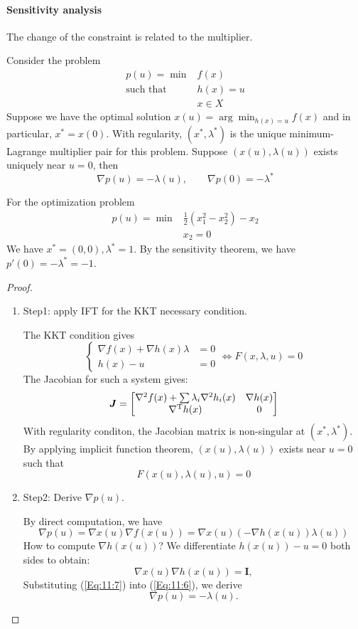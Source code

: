 \paragraph{Sensitivity analysis}
The change of the constraint is related to the multiplier. 
\begin{theorem}
Consider the problem
\[
\begin{array}{ll}
p(u)=\min&f(x)\\
\mbox{such that}&h(x)=u\\
&x\in X
\end{array}
\]
Suppose we have the optimal solution $x(u)=\arg\min_{h(x)=u}f(x)$ and in particular, $x^*=x(0)$. With regularity, $(x^*,\lambda^*)$ is the unique minimum-Lagrange multiplier pair for this problem. Suppose $(x(u),\lambda(u))$ exists uniquely near $u=0$, then
\[
\nabla p(u) = -\lambda(u),\qquad
\nabla p(0) = -\lambda^*
\]
\end{theorem}

\begin{example}
For the optimization problem
\[
\begin{array}{ll}
p(u)=\min&\frac{1}{2}(x_1^2-x_2^2) - x_2\\
&x_2=0
\end{array}
\]
We have $x^*=(0,0),\lambda^*=1$. By the sensitivity theorem, we have $p'(0)=-\lambda^*=-1$.
\end{example}
\begin{proof}
\begin{enumerate}
\item
Step1: apply IFT for the KKT necessary condition.

The KKT condition gives
\[
\left\{
\begin{aligned}
\nabla f(x) + \nabla h(x)\lambda&=0\\
h(x)- u&=0
\end{aligned}
\right.\Longleftrightarrow
F(x,\lambda,u)=0
\]
The Jacobian for such a system gives:
\[
\bm J=\begin{bmatrix}
\nabla^2f(x)+\sum\lambda_i\nabla^2h_i(x)&\nabla h(x)\\
\nabla^{\mathrm T} h(x)&0
\end{bmatrix}
\]
With regularity conditon, the Jacobian matrix is non-singular at $(x^*,\lambda^*)$. By applying implicit function theorem, $(x(u),\lambda(u))$ exists near $u=0$ such that
\[
F(x(u),\lambda(u),u)=0
\]
\item
Step2: Derive $\nabla p(u)$.

By direct computation, we have
\begin{equation}\label{Eq:11:6}
\nabla p(u)=\nabla x(u)\nabla f(x(u)) = \nabla x(u)\left(
-\nabla h(x(u))\lambda(u)
\right)
\end{equation}
How to compute $\nabla h(x(u))$? We differentiate $h(x(u)) - u=0$ both sides to obtain:
\begin{equation}\label{Eq:11:7}
\nabla x(u)\nabla h(x(u)) = \bm I,
\end{equation}
Substituting (\ref{Eq:11:7}) into (\ref{Eq:11:6}), we derive
\[
\nabla p(u)= -\lambda(u).
\]

\end{enumerate}
\end{proof}

